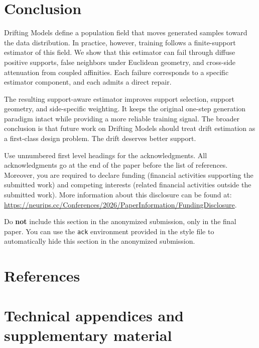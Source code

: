 \documentclass{article}
\begin{document}

\section{Conclusion}
\label{sec:conclusion}

Drifting Models define a population field that moves generated samples toward the data distribution.
In practice, however, training follows a finite-support estimator of this field.
We show that this estimator can fail through diffuse positive supports, false neighbors under Euclidean geometry, and cross-side attenuation from coupled affinities.
Each failure corresponds to a specific estimator component, and each admits a direct repair.

The resulting support-aware estimator improves support selection, support geometry, and side-specific weighting.
It keeps the original one-step generation paradigm intact while providing a more reliable training signal.
The broader conclusion is that future work on Drifting Models should treat drift estimation as a first-class design problem.
The drift deserves better support.



\begin{ack}
Use unnumbered first level headings for the acknowledgments. All acknowledgments
go at the end of the paper before the list of references. Moreover, you are required to declare
funding (financial activities supporting the submitted work) and competing interests (related financial activities outside the submitted work).
More information about this disclosure can be found at: \url{https://neurips.cc/Conferences/2026/PaperInformation/FundingDisclosure}.


Do {\bf not} include this section in the anonymized submission, only in the final paper. You can use the \texttt{ack} environment provided in the style file to automatically hide this section in the anonymized submission.
\end{ack}

\section*{References}

\medskip


{
\small



}


\appendix

\section{Technical appendices and supplementary material}




\newpage
% 
\end{document}

